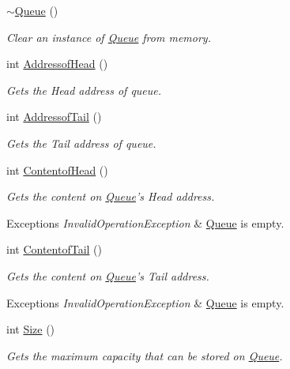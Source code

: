 \begin{DoxyCompactItemize}
\hyperlink{class_queue_a00d119db8fa3050da37746e82cbcf94f}{$\sim$\-Queue} ()
\begin{DoxyCompactList}\small\item\em Clear an instance of \hyperlink{class_queue}{Queue} from memory. \end{DoxyCompactList}\item 
int \hyperlink{class_queue_a087160b0386fe1fdc7a0217fc40e4c94}{Addressof\-Head} ()
\begin{DoxyCompactList}\small\item\em Gets the Head address of queue. \end{DoxyCompactList}\item 
int \hyperlink{class_queue_ae9c7db696b3a50729b339ced74e0887a}{Addressof\-Tail} ()
\begin{DoxyCompactList}\small\item\em Gets the Tail address of queue. \end{DoxyCompactList}\item 
int \hyperlink{class_queue_ac3aa4048853f51c0552d532036b31cd6}{Contentof\-Head} ()
\begin{DoxyCompactList}\small\item\em Gets the content on \hyperlink{class_queue}{Queue}'s Head address. 
\begin{DoxyExceptions}{Exceptions}
{\em Invalid\-Operation\-Exception} & \hyperlink{class_queue}{Queue} is empty. \\
\hline
\end{DoxyExceptions}
\end{DoxyCompactList}\item 
int \hyperlink{class_queue_a019423c548927a8830677d1d2fddb38c}{Contentof\-Tail} ()
\begin{DoxyCompactList}\small\item\em Gets the content on \hyperlink{class_queue}{Queue}'s Tail address. 
\begin{DoxyExceptions}{Exceptions}
{\em Invalid\-Operation\-Exception} & \hyperlink{class_queue}{Queue} is empty. \\
\hline
\end{DoxyExceptions}
\end{DoxyCompactList}\item 
int \hyperlink{class_queue_a2b28fe3446577261546f74b7bbe3ccc6}{Size} ()
\begin{DoxyCompactList}\small\item\em Gets the maximum capacity that can be stored on \hyperlink{class_queue}{Queue}. \end{DoxyCompactList}\item 

\end{DoxyCompactItemize}
